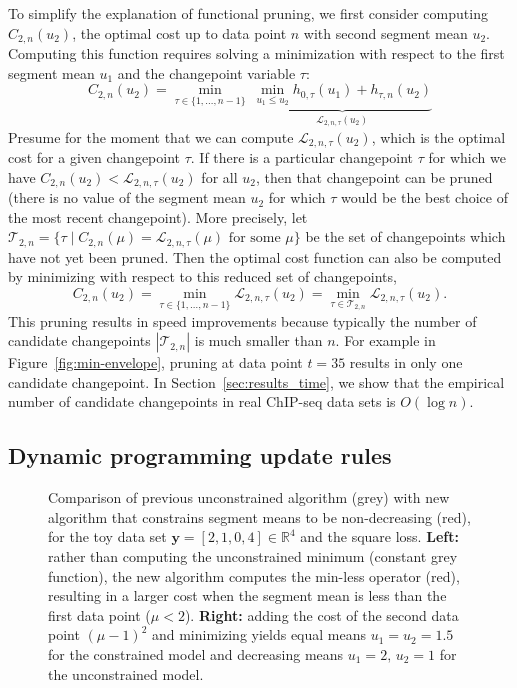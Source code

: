 \documentclass[aoas]{imsart}
\newcommand{\RR}{\mathbb R}
\begin{document}
To simplify the explanation of functional pruning, we first consider
computing $C_{2,n}(u_2)$, the optimal cost up to data point $n$ with
second segment mean $u_2$. Computing this function requires solving a
minimization with respect to the first segment mean $u_1$ and the
changepoint variable $\tau$:
\begin{equation}
  C_{2,n}(u_2) = 
\min_{\tau\in\{1,\dots,n-1\}}
\ 
\underbrace{\min_{u_1\leq u_2}
  h_{0,\tau}(u_1) +
h_{\tau, n}(u_2)}_{\mathcal L_{2,n,\tau}(u_2)}
\end{equation}
Presume for the moment that we can compute
$\mathcal L_{2,n,\tau}(u_2)$, which is the optimal cost for a given
changepoint $\tau$. If there is a particular changepoint $\tau$ for
which we have $C_{2,n}(u_2)<\mathcal L_{2,n,\tau}(u_2)$ for all $u_2$,
then that changepoint can be pruned (there is no value of the segment
mean $u_2$ for which $\tau$ would be the best choice of the most
recent changepoint). More precisely, let
$\mathcal T_{2,n}=\{ \tau\mid C_{2,n}(\mu)=\mathcal L_{2,n,\tau}(\mu)
\text{ for some $\mu$} \}$ be the set of changepoints which have not
yet been pruned.  Then the optimal cost function can also be computed
by minimizing with respect to this reduced set of changepoints,
\begin{equation}
  C_{2,n}(u_2) = 
\min_{\tau\in\{1,\dots,n-1\}}
\mathcal L_{2,n,\tau}(u_2)
=
\min_{\tau\in\mathcal T_{2,n}}
\mathcal L_{2,n,\tau}(u_2).
\end{equation}
This pruning results in speed improvements because typically the
number of candidate changepoints $|\mathcal T_{2,n}|$ is much smaller
than $n$. For example in Figure~\ref{fig:min-envelope}, pruning at
data point $t=35$ results in only one candidate changepoint. In
Section~\ref{sec:results_time}, we show that the empirical number of
candidate changepoints in real ChIP-seq data sets is $O(\log n)$.

\subsection{Dynamic programming update rules}
\label{sec:dyn-prog}

\begin{figure}[t!]
  \centering
  
  
  \vskip -0.5cm
  \caption{Comparison of previous unconstrained algorithm
    (\textcolor{Min}{grey}) with new algorithm that constrains segment
    means to be non-decreasing (\textcolor{Ckt}{red}), for the toy data
    set $\mathbf y= [ 2, 1, 0, 4 ] \in\RR^4$ and the square
    loss. \textbf{Left:} rather than computing the unconstrained
    minimum (constant grey function), the new algorithm computes the
    min-less operator (red), resulting in a larger cost when the
    segment mean is less than the first data point ($\mu <
    2$). \textbf{Right:} adding the cost of the second data point
    $(\mu-1)^2$ and minimizing yields equal means $u_1=u_2=1.5$ for
    the constrained model and decreasing means $u_1=2,\, u_2=1$ for
    the unconstrained model.}
  \label{fig:compare-unconstrained}
\end{figure}
\end{document}
